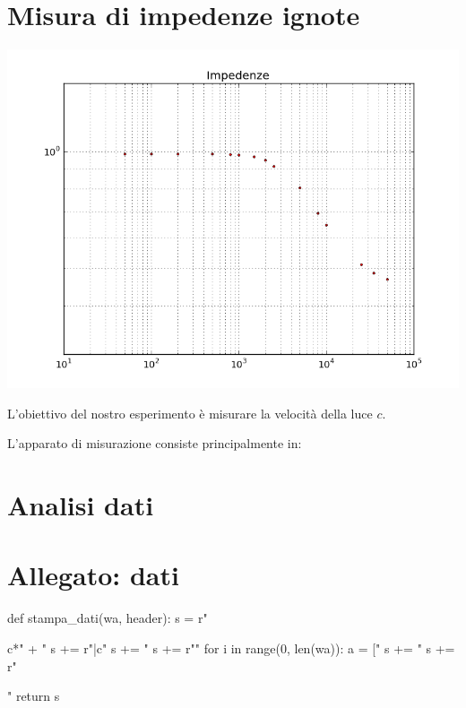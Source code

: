 \section{Misura di impedenze ignote}
\begin{center}
\includegraphics[scale=0.75]{grafici/C2-2.png} 
\end{center}

L'obiettivo del nostro esperimento è misurare la velocità della luce $c$.

L'apparato di misurazione consiste principalmente in:

\section{Analisi dati}

\section{Allegato: dati}
\begin{sagesilent}
def stampa_dati(wa, header):
  s = r"\begin{tabular}{c*{" + "%
  s += r"}{|c}}"
  s += "%
  s += r"\midrule"
  for i in range(0, len(wa)):
    a = ["%
    s += "%
  s += r"\end{tabular}"
  return s
\end{sagesilent}

\begin{center}

\end{center}

